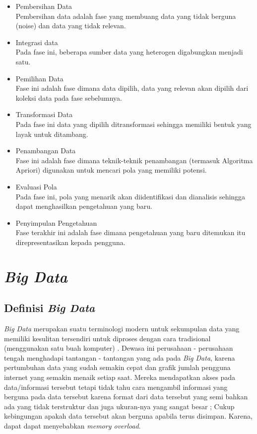 \begin{itemize}
	\item{Pembersihan Data} \\
	Pembersihan data adalah fase yang membuang data yang tidak berguna (noise) dan data yang tidak relevan.
	\item{Integrasi data} \\
	Pada fase ini, beberapa sumber data yang heterogen digabungkan menjadi satu.
	\item{Pemilihan Data} \\
	Fase ini adalah fase dimana data dipilih, data yang relevan akan dipilih dari koleksi data pada fase sebelumnya.
	\item{Transformasi Data} \\
	Pada fase ini data yang dipilih ditransformasi sehingga memiliki bentuk yang layak untuk ditambang.
	\item{Penambangan Data} \\
	Fase ini adalah fase dimana teknik-teknik penambangan (termasuk Algoritma Apriori) digunakan untuk mencari pola yang memiliki potensi.
	\item{Evaluasi Pola} \\
	Pada fase ini, pola yang menarik akan diidentifikasi dan dianalisis sehingga dapat menghasilkan pengetahuan yang baru.
	\item{Penyimpulan Pengetahuan} \\
	Fase terakhir ini adalah fase dimana pengetahuan yang baru ditemukan itu direpresentasikan kepada pengguna.
\end{itemize}

\section{{\it Big Data}}

\subsection{Definisi {\it Big Data}}
{\it Big Data} merupakan suatu terminologi modern untuk sekumpulan data yang memiliki kesulitan tersendiri untuk diproses dengan cara tradisional (menggunakan satu buah komputer) \cite{zikopoulos2011understanding}. Dewasa ini perusahaan - perusahaan tengah menghadapi tantangan - tantangan yang ada pada {\it Big Data}, karena pertumbuhan data yang sudah semakin cepat dan grafik jumlah pengguna internet yang semakin menaik setiap saat. Mereka mendapatkan akses pada data/informasi tersebut tetapi tidak tahu cara mengambil informasi yang berguna pada data tersebut karena format dari data tersebut yang semi bahkan ada yang tidak terstruktur dan juga ukuran-nya yang sangat besar ; Cukup kebingungan apakah data tersebut akan berguna apabila terus disimpan. Karena, dapat dapat menyebabkan {\it memory overload}.


